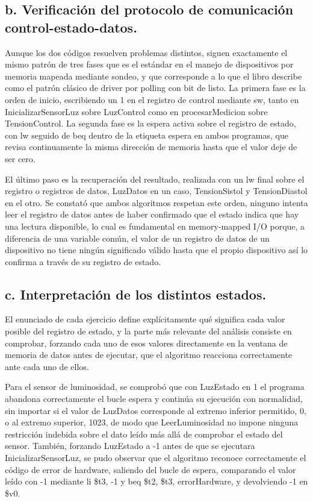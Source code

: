 \documentclass[12pt, letterpaper]{article}
\begin{document}
\subsection*{b. Verificación del protocolo de comunicación control-estado-datos.}

Aunque los dos códigos resuelven problemas distintos, siguen exactamente el mismo patrón de tres fases que es el estándar en el manejo de dispositivos por memoria mapeada mediante sondeo, y que corresponde a lo que el libro describe como el patrón clásico de driver por polling con bit de listo. La primera fase es la orden de inicio, escribiendo un 1 en el registro de control mediante sw, tanto en InicializarSensorLuz sobre LuzControl como en procesarMedicion sobre TensionControl. La segunda fase es la espera activa sobre el registro de estado, con lw seguido de beq dentro de la etiqueta espera en ambos programas, que revisa continuamente la misma dirección de memoria hasta que el valor deje de ser cero.

El último paso es la recuperación del resultado, realizada con un lw final sobre el registro o registros de datos, LuzDatos en un caso, TensionSistol y TensionDiastol en el otro. Se constató que ambos algoritmos respetan este orden, ninguno intenta leer el registro de datos antes de haber confirmado que el estado indica que hay una lectura disponible, lo cual es fundamental en memory-mapped I/O porque, a diferencia de una variable común, el valor de un registro de datos de un dispositivo no tiene ningún significado válido hasta que el propio dispositivo así lo confirma a través de su registro de estado.

\subsection*{c. Interpretación de los distintos estados.}

El enunciado de cada ejercicio define explícitamente qué significa cada valor posible del registro de estado, y la parte más relevante del análisis consiste en comprobar, forzando cada uno de esos valores directamente en la ventana de memoria de datos antes de ejecutar, que el algoritmo reacciona correctamente ante cada uno de ellos.

Para el sensor de luminosidad, se comprobó que con LuzEstado en 1 el programa abandona correctamente el bucle espera y continúa su ejecución con normalidad, sin importar si el valor de LuzDatos corresponde al extremo inferior permitido, 0, o al extremo superior, 1023, de modo que LeerLuminosidad no impone ninguna restricción indebida sobre el dato leído más allá de comprobar el estado del sensor. También, forzando LuzEstado a -1 antes de que se ejecutara InicializarSensorLuz, se pudo observar que el algoritmo reconoce correctamente el código de error de hardware, saliendo del bucle de espera, comparando el valor leído con -1 mediante li \$t3, -1 y beq \$t2, \$t3, errorHardware, y devolviendo -1 en \$v0.
\end{document}

